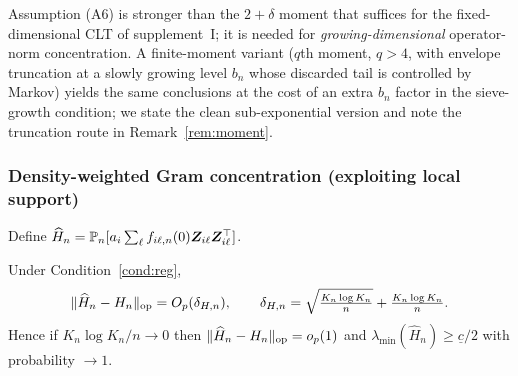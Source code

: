 \noindent Assumption (A6) is stronger than the $2{+}\delta$ moment that suffices
for the fixed-dimensional CLT of supplement~I; it is needed for
\emph{growing-dimensional} operator-norm concentration. A finite-moment variant
($q$th moment, $q>4$, with envelope truncation at a slowly growing level $b_n$
whose discarded tail is controlled by Markov) yields the same conclusions at the
cost of an extra $b_n$ factor in the sieve-growth condition; we state the clean
sub-exponential version and note the truncation route in Remark~\ref{rem:moment}.

\subsubsection{Density-weighted Gram concentration (exploiting local support)}
Define $\widehat H_n=\mathbb{P}_n[a_i\sum_\ell f_{i\ell,n}(0)\bm{Z}_{i\ell}\bm{Z}_{i\ell}^\top]$.
\begin{lemma}\label{lem:gram}
Under Condition~\ref{cond:reg},
\[
\|\widehat H_n-H_n\|_{\mathrm{op}}=O_p(\delta_{H,n}),\qquad
\delta_{H,n}=\sqrt{\tfrac{K_n\log K_n}{n}}+\tfrac{K_n\log K_n}{n}.
\]
Hence if $K_n\log K_n/n\to0$ then $\|\widehat H_n-H_n\|_{\mathrm{op}}=o_p(1)$ and
$\lambda_{\min}(\widehat H_n)\ge\underline c/2$ with probability $\to1$.
\end{lemma}
